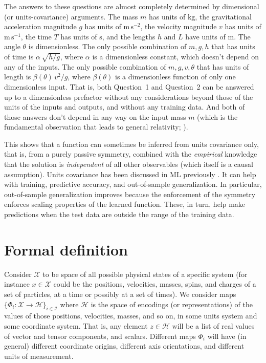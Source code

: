 \documentclass[preprint]{article} %
\renewcommand{\mathcal}[1]{\mathscr{#1}} %
\newcommand{\unit}[1]{\mathrm{#1}}
\newcommand{\kg}{\unit{kg}}
\newcommand{\m}{\unit{m}}
\newcommand{\s}{\unit{s}}
\begin{document}
The answers to these questions are almost completely determined by dimensional (or units-covariance) arguments.
The mass $m$ has units of $\kg$, the gravitational acceleration magnitude $g$ has units of $\m\,\s^{-2}$, the velocity magnitude $v$ has units of $\m\,\s^{-1}$, the time $T$ has units of $\s$, and the lengths $h$ and $L$ have units of $\m$.
The angle $\theta$ is dimensionless.
The only possible combination of $m, g, h$ that has units of time is $\alpha\,\sqrt{h/g}$, where $\alpha$ is a dimensionless constant, which doesn't depend on any of the inputs.
The only possible combination of $m, g, v, \theta$ that has units of length is $\beta(\theta)\,v^2/g$, where $\beta(\theta)$ is a dimensionless function of only one dimensionless input.
That is, both Question~1 and Question~2 can be answered up to a dimensionless prefactor without any considerations beyond those of the units of the inputs and outputs, and without any training data.
And both of those answers don't depend in any way on the input mass $m$ (which is the fundamental observation that leads to general relativity; \citealt{gr}).

This shows that a function can sometimes be inferred from units covariance only, that is, from a purely passive symmetry, combined with the \emph{empirical} knowledge that the solution is \emph{independent} of all other observables (which itself is a causal assumption).
Units covariance has been discussed in ML previously \citep{villar2022dimensionless, bakarji2022dimensionally, xie2022data}.
It can help with training, predictive accuracy, and out-of-sample generalization.
In particular, out-of-sample generalization improves because the enforcement of the symmetry enforces scaling properties of the learned function.
These, in turn, help make predictions when the test data are outside the range of the training data.

\section{Formal definition}\label{sec:definitions}
Consider $\mathcal{X}$ to be space of all possible physical states of a specific system (for instance $x\in \mathcal X$ could be the positions, velocities, masses, spins, and charges of a set of particles, at a time or possibly at a set of times).
We consider maps $\{\Phi_i: \mathcal{X} \to \mathcal{H}\}_{i\in \mathcal{I}}$ where $\mathcal{H}$ is the space of encodings (or representations) of the values of those positions, velocities, masses, and so on, in some units system and some coordinate system.
That is, any element $z\in \mathcal{H}$ will be a list of real values of vector and tensor components, and scalars.
Different maps $\Phi_i$ will have (in general) different coordinate origins, different axis orientations, and different units of measurement.
\end{document}

